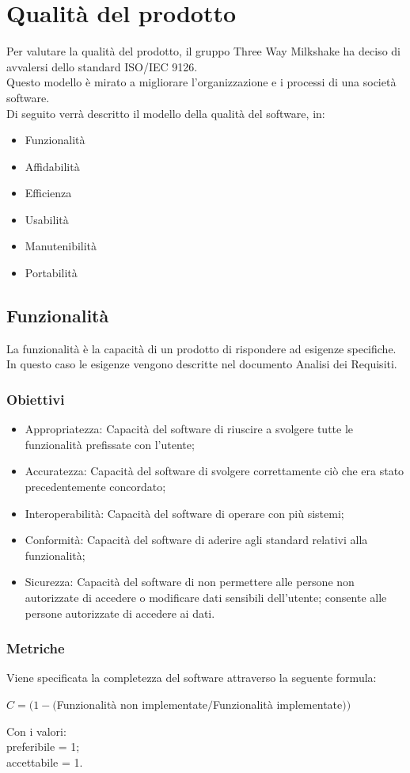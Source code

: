 \section{Qualità del prodotto}
Per valutare  la qualità del prodotto, il gruppo Three Way Milkshake ha deciso di avvalersi dello standard ISO/IEC 9126.\\
Questo modello è mirato a  migliorare l'organizzazione e i processi di una società software.\\
Di seguito verrà descritto il modello della qualità del software, in:
\begin{itemize}
	\item Funzionalità
	\item Affidabilità
	\item Efficienza
	\item Usabilità
	\item Manutenibilità
	\item Portabilità
\end{itemize}

\subsection{Funzionalità}
La funzionalità è la capacità di un prodotto di rispondere ad esigenze specifiche.\\
In questo caso le esigenze vengono descritte nel documento Analisi dei Requisiti.
\subsubsection{Obiettivi}
\begin{itemize}
	\item Appropriatezza: Capacità del software di riuscire a svolgere tutte le funzionalità prefissate con l'utente;
	\item Accuratezza: Capacità del software di svolgere correttamente ciò che era stato precedentemente concordato;
	\item Interoperabilità: Capacità del software di operare con più sistemi;
	\item Conformità: Capacità del software di aderire agli standard relativi alla funzionalità;
	\item Sicurezza: Capacità del software di non permettere alle persone non autorizzate di accedere o modificare dati sensibili dell'utente; consente alle persone autorizzate di accedere ai dati.
\end{itemize}

\subsubsection{Metriche}
Viene specificata la completezza del software attraverso la seguente formula:
\begin{center}
	$C = (1-($Funzionalità non implementate$ / $Funzionalità implementate$))$
\end{center}
Con i valori:\\
preferibile = 1;\\
accettabile = 1.


